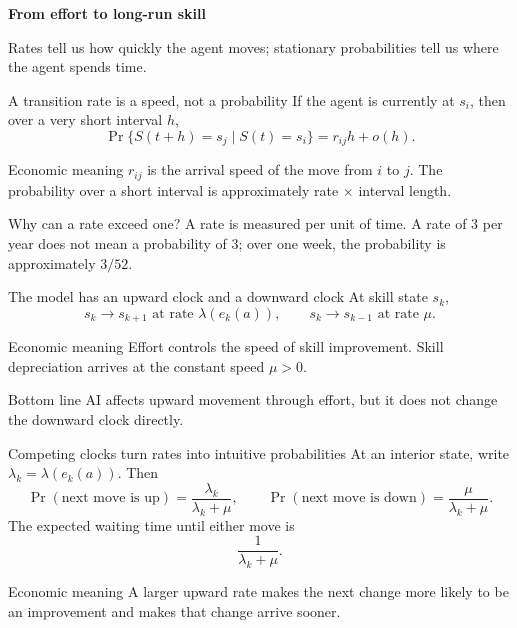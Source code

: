 \documentclass[aspectratio=169,11pt]{beamer}
\newcommand{\econmeaning}[1]{%
  \begin{block}{Economic meaning}
  #1
  \end{block}}
\newcommand{\bottomline}[1]{%
  \begin{alertblock}{Bottom line}
  #1
  \end{alertblock}}
\begin{document}

\begin{frame}[plain]
  \vspace{23mm}
  {\color{white}\Huge\bfseries From effort to long-run skill\par}
  \vspace{8mm}
  {\color{white!82}\Large Rates tell us how quickly the agent moves; stationary probabilities tell us where the agent spends time.\par}
\end{frame}

\begin{frame}{A transition rate is a speed, not a probability}
If the agent is currently at $s_i$, then over a very short interval $h$,
\[
\Pr\{S(t+h)=s_j\mid S(t)=s_i\}
=r_{ij}h+o(h).
\]
\econmeaning{$r_{ij}$ is the arrival speed of the move from $i$ to $j$. The probability over a short interval is approximately rate $\times$ interval length.}
\begin{exampleblock}{Why can a rate exceed one?}
A rate is measured per unit of time. A rate of $3$ per year does not mean a probability of $3$; over one week, the probability is approximately $3/52$.
\end{exampleblock}
\end{frame}

\begin{frame}{The model has an upward clock and a downward clock}
At skill state $s_k$,
\[
\boxed{s_k\to s_{k+1}\text{ at rate }\lambda(e_k(a)),
\qquad
s_k\to s_{k-1}\text{ at rate }\mu.}
\]
\econmeaning{Effort controls the speed of skill improvement. Skill depreciation arrives at the constant speed $\mu>0$.}
\bottomline{AI affects upward movement through effort, but it does not change the downward clock directly.}
\end{frame}

\begin{frame}{Competing clocks turn rates into intuitive probabilities}
At an interior state, write $\lambda_k=\lambda(e_k(a))$. Then
\[
\Pr(\text{next move is up})=\frac{\lambda_k}{\lambda_k+\mu},
\qquad
\Pr(\text{next move is down})=\frac{\mu}{\lambda_k+\mu}.
\]
The expected waiting time until either move is
\[
\frac{1}{\lambda_k+\mu}.
\]
\econmeaning{A larger upward rate makes the next change more likely to be an improvement and makes that change arrive sooner.}
\end{frame}
\end{document}
